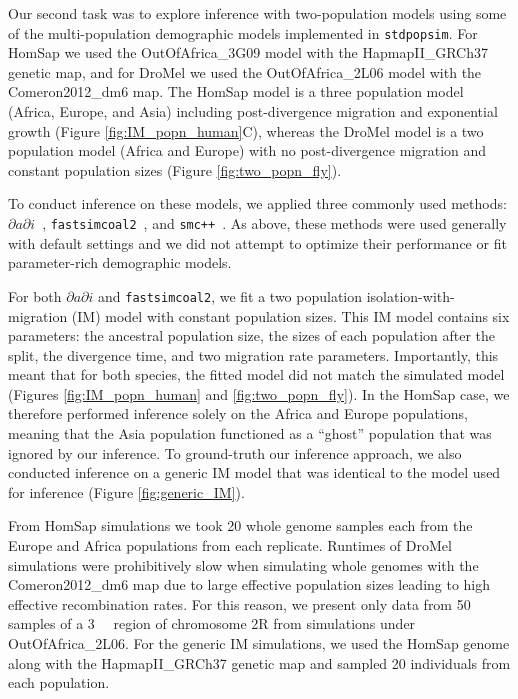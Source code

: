 \documentclass[12pt,halfline,a4paper]{ouparticle}
\newcommand{\stdpopsim}{\texttt{stdpopsim}\xspace}
\newcommand{\dadi}{$\partial a \partial i$\xspace}
\newcommand{\smcpp}{\texttt{smc++}\xspace}
\newcommand{\fastsimcoal}{\texttt{fastsimcoal2}\xspace}
\begin{document}
Our second task was to explore inference with two-population models
using some of the multi-population demographic models implemented in \stdpopsim.
For HomSap we used the OutOfAfrica\_3G09 model with the HapmapII\_GRCh37 genetic map,
and for DroMel we used the OutOfAfrica\_2L06 model with the Comeron2012\_dm6 map.
The HomSap model is a three population model (Africa, Europe, and Asia) including post-divergence
migration and exponential growth (Figure \ref{fig:IM_popn_human}C), whereas the
DroMel model is a two population model (Africa and Europe) with no post-divergence
migration and constant population sizes (Figure \ref{fig:two_popn_fly}).

To conduct inference on these models, we applied three commonly used methods:
\dadi~\citep{gutenkunst2009inferring}, \fastsimcoal~\citep{excoffier2013robust},
and \smcpp~\citep{terhorst2017robust}. As above, these methods were used
generally with default settings and we did not attempt to optimize their performance or fit
parameter-rich demographic models.

For both \dadi and \fastsimcoal, we fit a two population
isolation-with-migration (IM) model with constant population sizes.
This IM model contains six parameters:
the ancestral population size, the sizes of each population after the split,
the divergence time, and two migration rate parameters.
Importantly, this meant that for both species, the
fitted model did not match the simulated model (Figures \ref{fig:IM_popn_human} and \ref{fig:two_popn_fly}).
In the HomSap case, we therefore performed inference solely on the Africa
and Europe populations, meaning that the Asia population functioned as a ``ghost''
population that was ignored by our inference.
To ground-truth our inference approach, we also conducted
inference on a generic IM model that was identical to the model used for inference (Figure \ref{fig:generic_IM}).

From HomSap simulations we took 20 whole genome samples each from the Europe and Africa populations
from each replicate.
Runtimes of DroMel simulations were prohibitively slow when simulating whole genomes
with the Comeron2012\_dm6 map due to large effective population sizes leading to
high effective recombination rates. For this reason, we present only data
from 50 samples of a \SI{3}{\mega\byte} region of chromosome 2R from simulations under OutOfAfrica\_2L06.
For the generic IM simulations, we used the HomSap genome along with the
HapmapII\_GRCh37 genetic map and sampled 20 individuals from each population.
\end{document}
